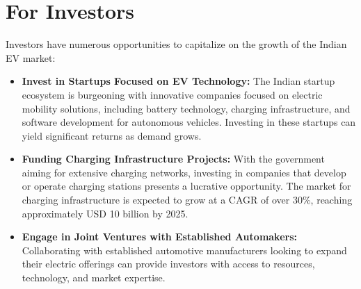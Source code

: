 \documentclass[a4paper,12pt]{report}
\begin{document}
\section{For Investors}
Investors have numerous opportunities to capitalize on the growth of the Indian EV market:
\begin{itemize}
    \item \textbf{Invest in Startups Focused on EV Technology: }
    The Indian startup ecosystem is burgeoning with innovative companies focused on electric mobility solutions, including battery technology, charging infrastructure, and software development for autonomous vehicles. Investing in these startups can yield significant returns as demand grows.
    \item \textbf{Funding Charging Infrastructure Projects: }
    With the government aiming for extensive charging networks, investing in companies that develop or operate charging stations presents a lucrative opportunity. The market for charging infrastructure is expected to grow at a CAGR of over 30\%, reaching approximately USD 10 billion by 2025.
    \item \textbf{Engage in Joint Ventures with Established Automakers: }
    Collaborating with established automotive manufacturers looking to expand their electric offerings can provide investors with access to resources, technology, and market expertise.
\end{itemize}


\end{document}
